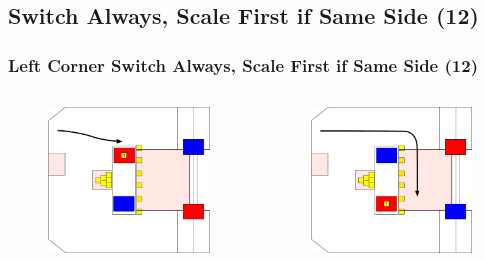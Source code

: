 \documentclass{beamer}
\begin{document}
\subsection{Switch Always, Scale First if Same Side (12)}

\begin{frame}
 \frametitle{Left Corner Switch Always, Scale First if Same Side \alert{(12)}}
 \begin{columns}
  \begin{figure}
   \includegraphics[scale=0.15]{assets/paths/12_LR}
  \end{figure}
  \begin{figure}
   \includegraphics[scale=0.15]{assets/paths/12_RL}

\end{figure}
\end{columns}
\end{frame}
\end{document}
